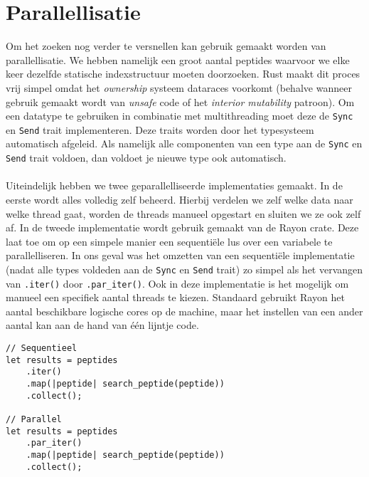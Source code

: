 \section{Parallellisatie}\label{sec:parallellisatie}
Om het zoeken nog verder te versnellen kan gebruik gemaakt worden van parallellisatie.
We hebben namelijk een groot aantal peptides waarvoor we elke keer dezelfde statische indexstructuur moeten doorzoeken.
Rust maakt dit proces vrij simpel omdat het \textit{ownership} systeem dataraces voorkomt (behalve wanneer gebruik gemaakt wordt van \textit{unsafe} code of het \textit{interior mutability} patroon)\cite{rust_data_races}.
Om een datatype te gebruiken in combinatie met multithreading moet deze de \texttt{Sync} en \texttt{Send} trait implementeren.
Deze traits worden door het typesysteem automatisch afgeleid.
Als namelijk alle componenten van een type aan de \texttt{Sync} en \texttt{Send} trait voldoen, dan voldoet je nieuwe type ook automatisch.
\\ \\
Uiteindelijk hebben we twee geparallelliseerde implementaties gemaakt.
In de eerste wordt alles volledig zelf beheerd.
Hierbij verdelen we zelf welke data naar welke thread gaat, worden de threads manueel opgestart en sluiten we ze ook zelf af.
In de tweede implementatie wordt gebruik gemaakt van de Rayon crate\cite{rayon}.
Deze laat toe om op een simpele manier een sequentiële lus over een variabele te parallelliseren.
In ons geval was het omzetten van een sequentiële implementatie (nadat alle types voldeden aan de \texttt{Sync} en \texttt{Send} trait) zo simpel als het vervangen van \texttt{.iter()} door \texttt{.par\_iter()}.
Ook in deze implementatie is het mogelijk om manueel een specifiek aantal threads te kiezen.
Standaard gebruikt Rayon het aantal beschikbare logische cores op de machine, maar het instellen van een ander aantal kan aan de hand van één lijntje code.

\begin{verbatim}
// Sequentieel
let results = peptides
    .iter()
    .map(|peptide| search_peptide(peptide))
    .collect();

// Parallel
let results = peptides
    .par_iter()
    .map(|peptide| search_peptide(peptide))
    .collect();
\end{verbatim}

